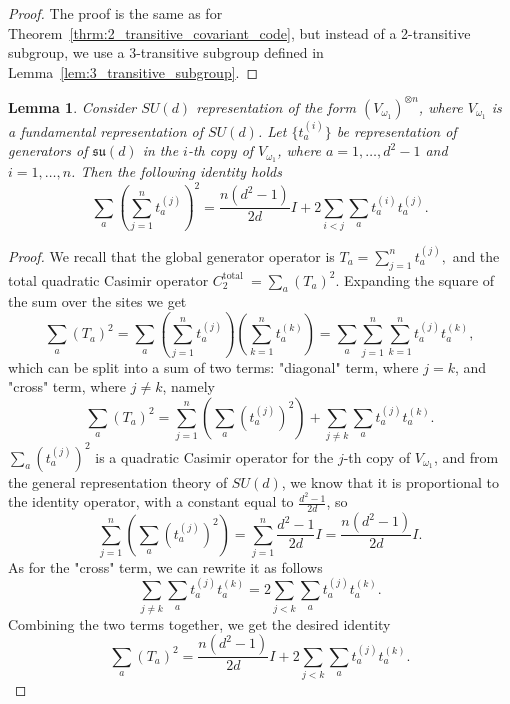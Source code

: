 \documentclass[11pt,letterpaper]{article}
\theoremstyle{plain}
\theoremstyle{plain}
\theoremstyle{plain}
\theoremstyle{plain}
\theoremstyle{plain}
\theoremstyle{plain}
\theoremstyle{plain}
\newtheorem{smlemma}[smtheorem]{Lemma}
\theoremstyle{definition}
\theoremstyle{plain}
\begin{document}
\begin{proof}
    The proof is the same as for Theorem~\ref{thrm:2_transitive_covariant_code}, but instead of a 2-transitive subgroup, 
    we use a 3-transitive subgroup defined in Lemma~\ref{lem:3_transitive_subgroup}.
\end{proof}

\begin{smlemma}\label{lem:generalisation_of_Casimir_identity}
Consider $SU(d)$ representation of the form $(V_{\omega_1})^{\otimes n}$, where $V_{\omega_1}$ is 
a fundamental representation of $SU(d)$. Let $\{t_a^{(i)}\}$ be representation of generators of $\mathfrak{su}(d)$ in the $i$-th copy of $V_{\omega_1}$, where $a=1, \ldots, d^2-1$ and $i=1, \ldots, n$. Then the following identity holds
\[
    \sum_a\left(\sum_{j=1}^n t^{(j)}_a\right)^2=\frac{n\left(d^2-1\right)}{2 d} I+2 \sum_{i<j} \sum_a t^{(i)}_a t^{(j)}_a.
\]
\end{smlemma}

\begin{proof}
    We recall that the global generator operator is
    $
        T_a=\sum_{j=1}^n t^{(j)}_a,
    $
    and the total quadratic Casimir operator
    $
        C_2^{\text {total }}=\sum_a\left(T_a\right)^2.
    $
    Expanding the square of the sum over the sites we get
    \[
        \sum_a\left(T_a\right)^2=\sum_a\left(\sum_{j=1}^n t^{(j)}_a\right)\left(\sum_{k=1}^n t^{(k)}_a\right)=\sum_a \sum_{j=1}^n \sum_{k=1}^n t^{(j)}_a t^{(k)}_a,
    \]
    which can be split into a sum of two terms: "diagonal" term, where $j=k$, and "cross" term, where $j \neq k$, namely
    \[
        \sum_a\left(T_a\right)^2=\sum_{j=1}^n\left(\sum_a\left(t^{(j)}_a\right)^2\right)+\sum_{j \neq k} \sum_a t^{(j)}_a t^{(k)}_a.
    \]
    $\sum_a\left(t^{(j)}_a\right)^2$ is a quadratic Casimir operator for the $j$-th copy of $V_{\omega_1}$, and from the general 
    representation theory of $SU(d)$, we know that it is proportional to the identity operator, with a constant equal to $\frac{d^2-1}{2 d}$, so
    \[
        \sum_{j=1}^n\left(\sum_a\left(t^{(j)}_a\right)^2\right)=\sum_{j=1}^n \frac{d^2-1}{2 d} I=\frac{n\left(d^2-1\right)}{2 d} I.
    \]
    As for the "cross" term, we can rewrite it as follows
    \[
        \sum_{j \neq k} \sum_a t^{(j)}_a t^{(k)}_a=2 \sum_{j<k} \sum_a t^{(j)}_a t^{(k)}_a.
    \]
    Combining the two terms together, we get the desired identity
    \[
        \sum_a\left(T_a\right)^2=\frac{n\left(d^2-1\right)}{2 d} I+2 \sum_{j<k} \sum_a t^{(j)}_a t^{(k)}_a.
    \]
\end{proof}
\end{document}
